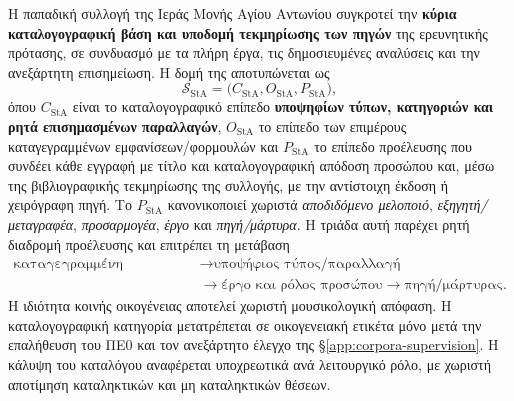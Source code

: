 \documentclass[11pt,a4paper]{article}
\begin{document}
Η παπαδική συλλογή της Ιεράς Μονής Αγίου Αντωνίου συγκροτεί την \textbf{κύρια καταλογογραφική βάση και υποδομή τεκμηρίωσης των πηγών} της ερευνητικής πρότασης, σε συνδυασμό με τα πλήρη έργα, τις δημοσιευμένες αναλύσεις και την ανεξάρτητη επισημείωση. Η δομή της αποτυπώνεται ως
\[
\mathcal S_{\mathrm{StA}}=
\bigl(C_{\mathrm{StA}},O_{\mathrm{StA}},P_{\mathrm{StA}}\bigr),
\]
όπου $C_{\mathrm{StA}}$ είναι το καταλογογραφικό επίπεδο \textbf{υποψηφίων τύπων, κατηγοριών και ρητά επισημασμένων παραλλαγών}, $O_{\mathrm{StA}}$ το επίπεδο των επιμέρους καταγεγραμμένων εμφανίσεων/φορμουλών και $P_{\mathrm{StA}}$ το επίπεδο προέλευσης που συνδέει κάθε εγγραφή με τίτλο και καταλογογραφική απόδοση προσώπου και, μέσω της βιβλιογραφικής τεκμηρίωσης της συλλογής, με την αντίστοιχη έκδοση ή χειρόγραφη πηγή. Το $P_{\mathrm{StA}}$ κανονικοποιεί χωριστά \emph{αποδιδόμενο μελοποιό}, \emph{εξηγητή/μεταγραφέα}, \emph{προσαρμογέα}, \emph{έργο} και \emph{πηγή/μάρτυρα}. Η τριάδα αυτή παρέχει ρητή διαδρομή προέλευσης και επιτρέπει τη μετάβαση
\[
\begin{aligned}
\text{καταγεγραμμένη φόρμουλα}
&\rightarrow \text{υποψήφιος τύπος/παραλλαγή}\\
&\rightarrow \text{έργο και ρόλος προσώπου}
\rightarrow \text{πηγή/μάρτυρας}.
\end{aligned}
\]
Η ιδιότητα κοινής οικογένειας αποτελεί χωριστή μουσικολογική απόφαση. Η καταλογογραφική κατηγορία μετατρέπεται σε οικογενειακή ετικέτα μόνο μετά την επαλήθευση του ΠΕ0 και τον ανεξάρτητο έλεγχο της §\ref{app:corpora-supervision}. Η κάλυψη του καταλόγου αναφέρεται υποχρεωτικά ανά λειτουργικό ρόλο, με χωριστή αποτίμηση καταληκτικών και μη καταληκτικών θέσεων.
\end{document}
